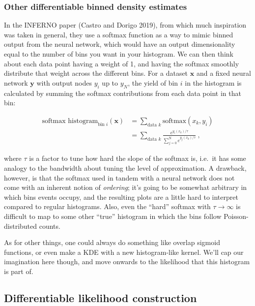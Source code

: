 \documentclass[
  11pt,
  numbers=noendperiod]{book}
\begin{document}
\hypertarget{other-differentiable-binned-density-estimates}{%
\subsubsection*{Other differentiable binned density
estimates}\label{other-differentiable-binned-density-estimates}}

In the INFERNO paper (Castro and Dorigo 2019), from which much
inspiration was taken in general, they use a softmax function as a way
to mimic binned output from the neural network, which would have an
output dimensionality equal to the number of bins you want in your
histogram. We can then think about each data point having a weight of 1,
and having the softmax smoothly distribute that weight across the
different bins. For a dataset \(\mathbf{x}\) and a fixed neural network
\(\mathbf{y}\) with output nodes \(y_i\) up to \(y_N\), the yield of bin
\(i\) in the histogram is calculated by summing the softmax
contributions from each data point in that bin:

\begin{align}
\text{softmax histogram}_{\text{bin } i}(\mathbf{x}) &= \sum_{\text{data }k} \text{softmax}(x_k, y_i) \\
&= \sum_{\text{data }k} \frac{e^{y_{i}(x_k) / \tau}}{\sum_{j=0}^{\text{N}} e^{y_{j}(x_k) / \tau}}~,
\end{align}

where \(\tau\) is a factor to tune how hard the slope of the softmax is,
i.e.~it has some analogy to the bandwidth about tuning the level of
approximation. A drawback, however, is that the softmax used in tandem
with a neural network does not come with an inherent notion of
\emph{ordering}; it's going to be somewhat arbitrary in which bins
events occupy, and the resulting plots are a little hard to interpret
compared to regular histograms. Also, even the ``hard'' softmax with
\(\tau \rightarrow \infty\) is difficult to map to some other ``true''
histogram in which the bins follow Poisson-distributed counts.

As for other things, one could always do something like overlap sigmoid
functions, or even make a KDE with a new histogram-like kernel. We'll
cap our imagination here though, and move onwards to the likelihood that
this histogram is part of.

\hypertarget{differentiable-likelihood-construction}{%
\subsection{Differentiable likelihood
construction}\label{differentiable-likelihood-construction}}
\end{document}
